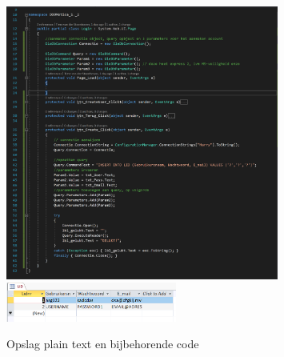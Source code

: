 \documentclass[11pt]{article}
\begin{document}
\begin{figure}[h]
	\centering
	\includegraphics[width=0.8\textwidth]{ipt}
	\newline
	\includegraphics[width=0.5\textwidth]{opt}
	\caption{Opslag plain text en bijbehorende code}
	\label{Plaintext}
\end{figure}
\newpage
\end{document}
